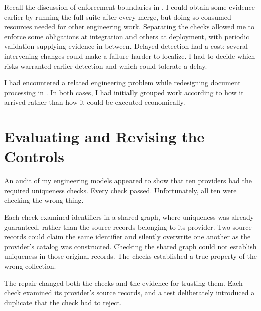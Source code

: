 Recall the discussion of enforcement boundaries in . I could obtain some evidence earlier by running the full suite after every merge, but doing so consumed resources needed for other engineering work. Separating the checks allowed me to enforce some obligations at integration and others at deployment, with periodic validation supplying evidence in between. Delayed detection had a cost: several intervening changes could make a failure harder to localize. I had to decide which risks warranted earlier detection and which could tolerate a delay.

I had encountered a related engineering problem while redesigning document processing in . In both cases, I had initially grouped work according to how it arrived rather than how it could be executed economically.


\section{Evaluating and Revising the Controls}\label{heading:engineering-capital-depreciates}

An audit of my engineering models appeared to show that ten providers had the required uniqueness checks. Every check passed. Unfortunately, all ten were checking the wrong thing.

Each check examined identifiers in a shared graph, where uniqueness was already guaranteed, rather than the source records belonging to its provider. Two source records could claim the same identifier and silently overwrite one another as the provider's catalog was constructed. Checking the shared graph could not establish uniqueness in those original records. The checks established a true property of the wrong collection.

The repair changed both the checks and the evidence for trusting them. Each check examined its provider's source records, and a test deliberately introduced a duplicate that the check had to reject.

